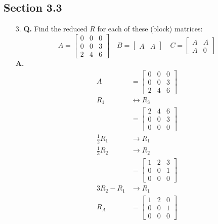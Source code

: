 \documentclass[main.tex]{subfiles}
\begin{document}
\subsection{Section 3.3}
\begin{enumerate}
    \item [3.] \textbf{Q.} Find the reduced $R$ for each of these (block) matrices:
        $$
        A=\left[\begin{array}{lll}
        0 & 0 & 0 \\
        0 & 0 & 3 \\
        2 & 4 & 6
        \end{array}\right] \quad B=\left[\begin{array}{ll}
        A & A
        \end{array}\right] \quad C=\left[\begin{array}{ll}
        A & A \\
        A & 0
        \end{array}\right]
        $$
        \textbf{A.}
        $$
        \begin{aligned}
        A &= \left[\begin{array}{lll}
        0 & 0 & 0 \\
        0 & 0 & 3 \\
        2 & 4 & 6
        \end{array}\right]\\
        R_1 & \leftrightarrow R_3\\
        &=\left[\begin{array}{lll}
        2 & 4 & 6 \\
        0 & 0 & 3 \\
        0 & 0 & 0
        \end{array}\right]\\
        \frac{1}{2}R_1 & \rightarrow R_1\\
        \frac{1}{3}R_2 & \rightarrow R_2\\
        & = \left[\begin{array}{lll}
        1 & 2 & 3 \\
        0 & 0 & 1 \\
        0 & 0 & 0
        \end{array}\right]\\
        3R_2 - R_1 & \rightarrow R_1\\
        R_{A} &= \left[\begin{array}{lll}
        1 & 2 & 0 \\
        0 & 0 & 1 \\
        0 & 0 & 0
        \end{array}\right]
        \end{aligned}
        $$
        

\end{enumerate}
\end{document}

